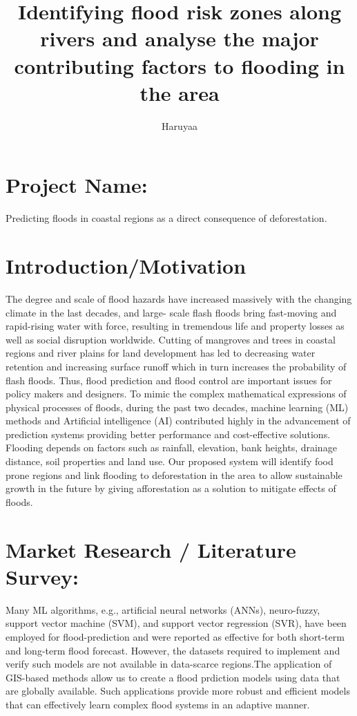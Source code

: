 \documentclass{article}
\title{Identifying flood risk zones along rivers and analyse the major contributing factors to flooding in the area  }
\author{Haruyaa}
\begin{document}
	\maketitle
	\section*{Project Name:}
		Predicting floods in coastal regions as a direct consequence of deforestation.
	\section*{Introduction/Motivation}
		The degree and scale of flood hazards have increased massively with the changing climate in the last decades, and large-		scale flash floods bring fast-moving and rapid-rising water with force, resulting in tremendous life and property losses as well as social disruption worldwide. Cutting of mangroves and trees in coastal regions and river plains for land development has led to decreasing water retention and increasing surface runoff which in turn increases the probability of flash floods. Thus, flood prediction and flood control are important issues for policy makers and designers. To mimic the complex mathematical expressions of physical processes of floods, during the past two decades, machine learning (ML) methods and Artificial intelligence (AI) contributed highly in the advancement of prediction systems providing better performance and cost-effective solutions.
Flooding depends on factors such as rainfall, elevation, bank heights, drainage distance, soil properties and land use. Our proposed system will identify food prone regions and link flooding to deforestation in the area to allow sustainable growth in the future by giving afforestation as a solution to mitigate effects of floods.   
	\section*{Market Research / Literature Survey:}
		Many ML algorithms, e.g., artificial neural networks (ANNs), neuro-fuzzy, support vector machine (SVM), and support vector regression (SVR), have been employed for flood-prediction and were reported as effective for both short-term and long-term flood forecast. However, the datasets required to implement and verify such models are not available in data-scarce regions.The application of GIS-based methods allow us to create a flood prdiction models using data that are globally available. Such applications provide more robust and efficient models that can effectively learn complex flood systems in an adaptive manner. 
\end{document}
